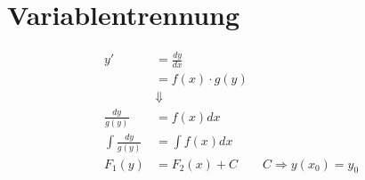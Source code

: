 \section{Variablentrennung}
\begin{align*}
y' &= \frac{d y}{d x} \\
&= f(x)\cdot g(y)\\
&\Downarrow\\
\frac{d y}{g(y)} &= f(x)d x\\
\int{\frac{d y}{g(y)}} &= \int{f(x)d x}\\
F_{1}(y) &= F_{2}(x)+C \qquad C\Rightarrow y(x_{0}) = y_{0}
\end{align*}